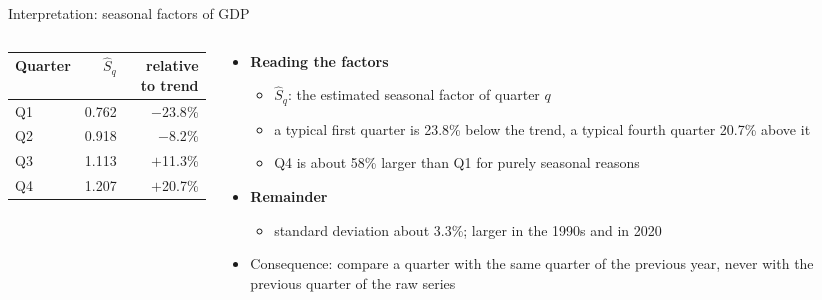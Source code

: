 \begin{frame}{Interpretation: seasonal factors of GDP}
\itemsize{\footnotesize}
\begin{columns}[T]
\begin{column}{0.36\textwidth}
\begin{center}
\footnotesize
\begin{tabular}{lrr}
\toprule
\textbf{Quarter} & $\hat S_q$ & relative to trend \\
\midrule
Q1 & 0.762 & $\ensuremath{-}23.8$\% \\
Q2 & 0.918 & $\ensuremath{-}8.2$\% \\
Q3 & 1.113 & $+$11.3\% \\
Q4 & 1.207 & $+$20.7\% \\
\bottomrule
\end{tabular}
\end{center}

\end{column}
\begin{column}{0.60\textwidth}
\begin{itemize}
    \item \textbf{Reading the factors}
    \begin{itemize}
        \item $\hat S_q$: the estimated seasonal factor of quarter $q$
        \item a typical first quarter is 23.8\% below the trend, a typical fourth quarter 20.7\% above it
        \item Q4 is about 58\% larger than Q1 for purely seasonal reasons
    \end{itemize}
    \item \textbf{Remainder}
    \begin{itemize}
        \item standard deviation about 3.3\%; larger in the 1990s and in 2020
    \end{itemize}
    \item Consequence: compare a quarter with the same quarter of the previous year, never with the previous quarter of the raw series
\end{itemize}
\end{column}
\end{columns}
\end{frame}

